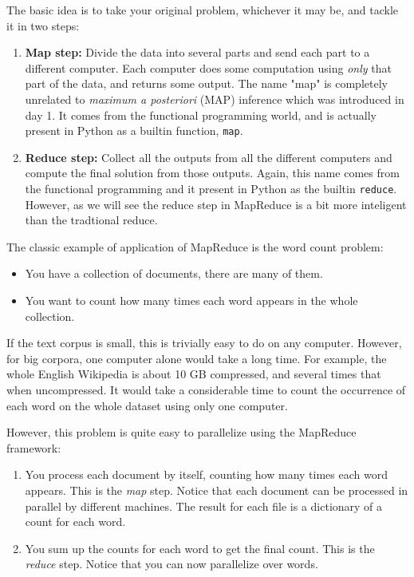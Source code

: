 The basic idea is to take your original problem, whichever it may be, and tackle it in two steps:
%
\begin{enumerate}
\item \textbf{Map step:} Divide the data into several parts and send each part
to a different computer. Each computer does some computation using \emph{only}
that part of the data, and returns some output. The name "map" is completely
unrelated to \emph{maximum a posteriori} (MAP) inference which was introduced
in day 1. It comes from the functional programming world, and is actually
present in Python as a builtin function, \verb+map+.
\item \textbf{Reduce step:} Collect all the outputs from all the different
computers and compute the final solution from those outputs. Again, this name
comes from the functional programming and it present in Python as the builtin
\verb+reduce+. However, as we will see the reduce step in MapReduce is a bit
more inteligent than the tradtional reduce.
\end{enumerate}


The classic example of application of MapReduce is the word count problem:

\begin{itemize}
\item You have a collection of documents, there are many of them.
\item You want to count how many times each word appears in the whole collection.
\end{itemize}

If the text corpus is small, this is trivially easy to do on any computer. However, for big corpora, one computer alone would take a long time. For example, the whole English Wikipedia is about 10 GB compressed, and several times that when uncompressed. It would take a considerable time to count the occurrence of each word on the whole dataset using only one computer.

However, this problem is quite easy to parallelize using the MapReduce framework:

\begin{enumerate}
\item You process each document by itself, counting how many times each word
appears. This is the \emph{map} step. Notice that each document can be
processed in parallel by different machines. The result for each file is a
dictionary of a count for each word.
\item You sum up the counts for each word to get the final count. This is the
\emph{reduce} step. Notice that you can now parallelize over words.
\end{enumerate}

